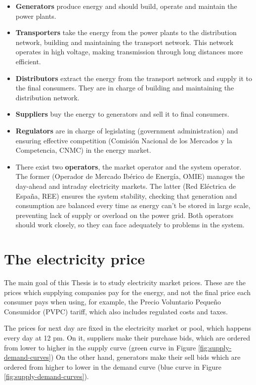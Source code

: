 \begin{itemize}
    \item \textbf{Generators} produce energy and should build, operate and maintain the power plants.
    \item \textbf{Transporters} take the energy from the power plants to the distribution network, building and maintaining the transport network. This network operates in high voltage, making transmission through long distances more efficient.
    \item \textbf{Distributors} extract the energy from the transport network and supply it to the final consumers. They are in charge of building and maintaining the distribution network.
    \item \textbf{Suppliers} buy the energy to generators and sell it to final consumers.
    \item \textbf{Regulators} are in charge of legislating (government administration) and ensuring effective competition (Comisión Nacional de los Mercados y la Competencia, CNMC) in the energy market.
    \item There exist two \textbf{operators}, the market operator and the system operator. The former (Operador de Mercado Ibérico de Energía, OMIE) manages the day-ahead and intraday electricity markets. The latter (Red Eléctrica de España, REE) ensures the system stability, checking that generation and consumption are balanced every time as energy can't be stored in large scale, preventing lack of supply or overload on the power grid. Both operators should work closely, so they can face adequately to problems in the system.
\end{itemize}

\section{The electricity price}
The main goal of this Thesis is to study electricity market prices.
These are the prices which supplying companies pay for the energy, and not the final price each consumer pays when using, for example, the Precio Voluntario Pequeño Consumidor (PVPC) tariff, which also includes regulated costs and taxes. \cite{mercado-electrico-xataka}

The prices for next day are fixed in the electricity market or pool, which happens every day at 12 pm.
On it, suppliers make their purchase bids, which are ordered from lower to higher in the supply curve (green curve in Figure \ref{fig:supply-demand-curves})
On the other hand, generators make their sell bids which are ordered from higher to lower in the demand curve (blue curve in Figure \ref{fig:supply-demand-curves}).

